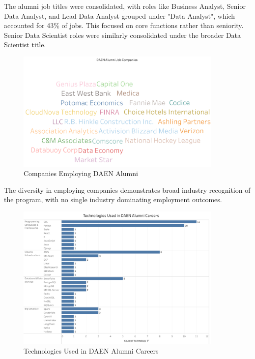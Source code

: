 \documentclass[12pt,a4paper]{article}
\begin{document}
The alumni job titles were consolidated, with roles like Business Analyst, Senior Data Analyst, and Lead Data Analyst grouped under "Data Analyst", which accounted for 43\% of jobs. This focused on core functions rather than seniority. Senior Data Scientist roles were similarly consolidated under the broader Data Scientist title.

\begin{figure}[H]
    \centering
    \includegraphics[width=0.9\textwidth]{visualizations/job-companies.png}
    \caption{Companies Employing DAEN Alumni}
    \label{fig:job-companies}
\end{figure}

The diversity in employing companies demonstrates broad industry recognition of the program, with no single industry dominating employment outcomes. 

\begin{figure}[H]
    \centering
    \includegraphics[width=0.9\textwidth]{visualizations/career-technologies.png}
    \caption{Technologies Used in DAEN Alumni Careers}
    \label{fig:career-technologies}
\end{figure}
\end{document}
